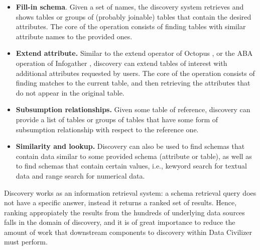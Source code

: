 \begin{itemize}
\item \textbf{Fill-in schema}. Given a set of names, the discovery system
retrieves and shows tables or groups of (probably joinable) tables that contain
the desired attributes. The core of the operation consists of finding tables
with similar attribute names to the provided ones.
\item \textbf{Extend attribute.} Similar to the extend operator of Octopus
\cite{octopus}, or the ABA operation of Infogather \cite{DBLP:conf/sigmod/YakoutGCC12}, discovery
can extend tables of interest with additional attributes requested by users. The
core of the operation consists of finding matches to the current table, and then
retrieving the attributes that do not appear in the original table.
\item \textbf{Subsumption relationships.} Given some table of reference,
discovery can provide a list of tables or groups of tables that have some form
of subsumption relationship with respect to the reference one. 
\item \textbf{Similarity and lookup.} Discovery can also be used to find schemas
that contain data similar to some provided schema (attribute or table), as well
as to find schemas that contain certain values, i.e., kewyord search for
textual data and range search for numerical data.
\end{itemize}

Discovery works as an information retrieval system: a schema retrieval query
does not have a specific answer, instead it returns a ranked set of results.
Hence, ranking appropiately the results from the hundreds of underlying data
sources falls in the domain of discovery, and it is of great importance to reduce
the amount of work that downstream components to discovery within Data Civilizer
must perform.

